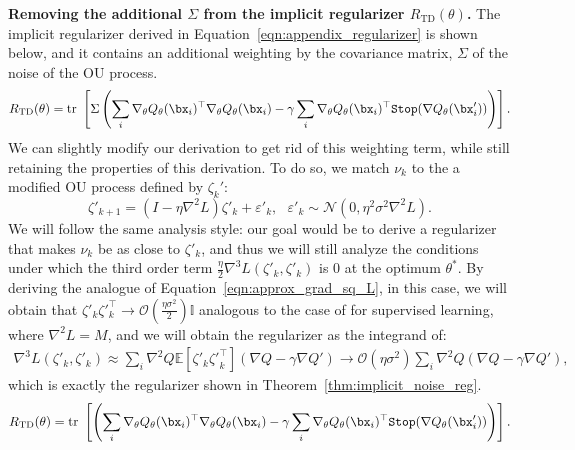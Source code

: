 \textbf{Removing the additional $\Sigma$ from the implicit regularizer $R_\mathrm{TD}(\theta)$.} The implicit regularizer derived in Equation~\ref{eqn:appendix_regularizer} is shown below, and it contains an additional weighting by the covariance matrix, $\Sigma$ of the noise of the OU process. 
\begin{equation*}
    R_\mathrm{TD}(\theta) = \text{tr}~\left[\Sigma \left(\sum_i \nabla_\theta Q_\theta(\bx_i)^\top \nabla_\theta Q_\theta(\bx_i) - \gamma \sum_i \nabla_\theta Q_\theta(\bx_i)^\top \texttt{Stop}(\nabla Q_\theta(\bx'_i)) \right) \right]. 
\end{equation*}
We can slightly modify our derivation to get rid of this weighting term, while still retaining the properties of this derivation. To do so, we match $\nu_{k}$ to the a modified OU process defined by $\zeta_k'$:
\begin{equation}
    \label{eqn:ou_process_modified}
    \zeta'_{k+1} = (I - \eta \nabla^2 L) \zeta'_k + \varepsilon'_k, ~~~ \varepsilon'_k \sim \mathcal{N}(0, \eta^2 \sigma^2 \nabla^2 L).
\end{equation}
We will follow the same analysis style: our goal would be to derive a regularizer that makes $\nu_k$ be as close to $\zeta'_k$, and thus we will still analyze the conditions under which the third order term $\frac{\eta}{2} \nabla^3 L (\zeta'_k, \zeta'_k)$ is 0 at the optimum $\theta^*$. By deriving the analogue of Equation~\ref{eqn:approx_grad_sq_L}, in this case, we will obtain that $\zeta'_k \zeta'_k^\top \rightarrow \mathcal{O}(\frac{\eta \sigma^2}{2}) \mathbb{I}$ analogous to the case of \citet{blanc2020implicit} for supervised learning, where $\nabla^2 L = M$, and we will obtain the regularizer as the integrand of:
\begin{align}
\label{eqn:approx_grad_sq_L_new}
    \nabla^3 L (\zeta'_k, \zeta'_k) \approx \sum_i \nabla^2 Q \mathbb{E}[\zeta'_k {\zeta'}^{\top}_k] (\nabla Q - \gamma \nabla Q') \rightarrow \mathcal{O}(\eta \sigma^2) \sum_i \nabla^2 Q (\nabla Q - \gamma \nabla Q'),
\end{align}
which is exactly the regularizer shown in Theorem~\ref{thm:implicit_noise_reg}.
\begin{equation}
\label{eqn:main_paper_regularizer}
     R_\mathrm{TD}(\theta) = \text{tr}~\left[ \left(\sum_i \nabla_\theta Q_\theta(\bx_i)^\top \nabla_\theta Q_\theta(\bx_i) - \gamma \sum_i \nabla_\theta Q_\theta(\bx_i)^\top \texttt{Stop}(\nabla Q_\theta(\bx'_i)) \right) \right].
\end{equation}
